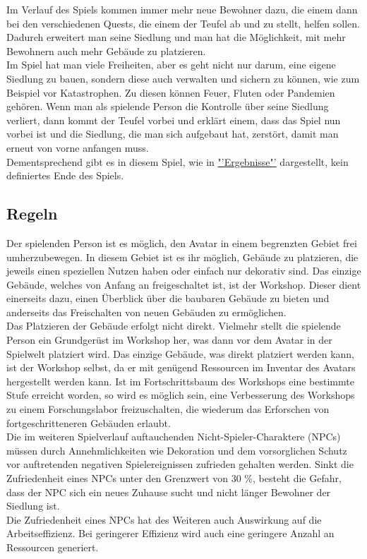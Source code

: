 \documentclass[paper=A4,pagesize=auto,12pt,headinclude=true,footinclude=true,BCOR=0mm,DIV=calc]{scrartcl}
\newcommand{\sectionspace}{
	\vspace{0.5cm}
}
\begin{document}
Im Verlauf des Spiels kommen immer mehr neue Bewohner dazu, die einem dann bei den verschiedenen Quests, die einem der Teufel ab und zu stellt, helfen sollen. Dadurch erweitert man seine Siedlung und man hat die Möglichkeit, mit mehr Bewohnern auch mehr Gebäude zu platzieren. \\
Im Spiel hat man viele Freiheiten, aber es geht nicht nur darum, eine eigene Siedlung zu bauen, sondern diese auch verwalten und sichern zu können, wie zum Beispiel vor Katastrophen. Zu diesen können Feuer, Fluten oder Pandemien gehören. Wenn man als spielende Person die Kontrolle über seine Siedlung verliert, dann kommt der Teufel vorbei und erklärt einem, dass das Spiel nun vorbei ist und die Siedlung, die man sich aufgebaut hat, zerstört, damit man erneut von vorne anfangen muss. \\
Dementsprechend gibt es in diesem Spiel, wie in \hyperref[sec:Ergebnisse]{"'Ergebnisse"'} dargestellt, kein definiertes Ende des Spiels. %


\sectionspace
\subsection{Regeln}\label{sec:Regeln}
Der spielenden Person ist es möglich, den Avatar in einem begrenzten Gebiet frei umherzubewegen. In diesem Gebiet ist es ihr möglich, Gebäude zu platzieren, die jeweils einen speziellen Nutzen haben oder einfach nur dekorativ sind. Das einzige Gebäude, welches von Anfang an freigeschaltet ist, ist der Workshop. Dieser dient einerseits dazu, einen Überblick über die baubaren Gebäude zu bieten und anderseits das Freischalten von neuen Gebäuden zu ermöglichen. \\
Das Platzieren der Gebäude erfolgt nicht direkt. Vielmehr stellt die spielende Person ein Grundgerüst im Workshop her, was dann vor dem Avatar in der Spielwelt platziert wird. Das einzige Gebäude, was direkt platziert werden kann, ist der Workshop selbst, da er mit genügend Ressourcen im Inventar des Avatars hergestellt werden kann.
Ist im Fortschrittsbaum des Workshops eine bestimmte Stufe erreicht worden, so wird es möglich sein, eine Verbesserung des Workshops zu einem Forschungslabor freizuschalten, die wiederum das Erforschen von fortgeschritteneren Gebäuden erlaubt. \\
Die im weiteren Spielverlauf auftauchenden Nicht-Spieler-Charaktere (NPCs) müssen durch Annehmlichkeiten wie Dekoration und dem vorsorglichen Schutz vor auftretenden negativen Spielereignissen zufrieden gehalten werden. Sinkt die Zufriedenheit eines NPCs unter den Grenzwert von 30 \%, besteht die Gefahr, dass der NPC sich ein neues Zuhause sucht und nicht länger Bewohner der Siedlung ist. \\ %
Die Zufriedenheit eines NPCs hat des Weiteren auch Auswirkung auf die Arbeitseffizienz. Bei geringerer Effizienz wird auch eine geringere Anzahl an Ressourcen generiert.
\end{document}
